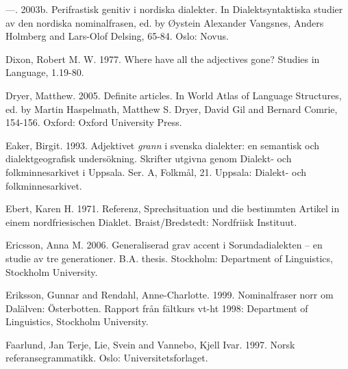 —. 2003b. Perifrastisk genitiv i nordiska dialekter. In Dialektsyntaktiska studier av den nordiska nominalfrasen, ed. by Øystein Alexander Vangsnes, Anders Holmberg and Lars-Olof Delsing, 65-84. Oslo: Novus.


Dixon, Robert M. W. 1977. Where have all the adjectives gone? Studies in Language, 1.19-80.


Dryer, Matthew. 2005. Definite articles. In World Atlas of Language Structures, ed. by Martin Haspelmath, Matthew S. Dryer, David Gil and Bernard Comrie, 154-156. Oxford: Oxford University Press.


Eaker, Birgit. 1993. Adjektivet \textit{grann} i svenska dialekter: en semantisk och dialektgeografisk undersökning. Skrifter utgivna genom Dialekt- och folkminnesarkivet i Uppsala. Ser. A, Folkmål, 21. Uppsala: Dialekt- och folkminnesarkivet.


Ebert, Karen H. 1971. Referenz, Sprechsituation und die bestimmten Artikel in einem nordfriesischen Diaklet. Braist/Bredstedt: Nordfriisk Instituut.


Ericsson, Anna M. 2006. Generaliserad grav accent i Sorundadialekten – en studie av tre generationer. B.A. thesis. Stockholm: Department of Linguistics, Stockholm University.


Eriksson, Gunnar and Rendahl, Anne-Charlotte. 1999. Nominalfraser norr om Dalälven: Österbotten. Rapport från fältkurs vt-ht 1998: Department of Linguistics, Stockholm University.


Faarlund, Jan Terje, Lie, Svein and Vannebo, Kjell Ivar. 1997. Norsk referansegrammatikk. Oslo: Universitetsforlaget.



